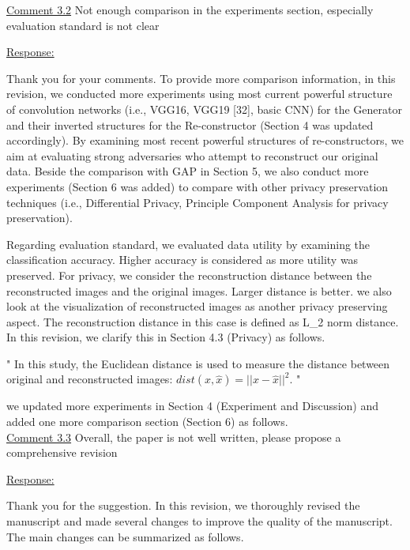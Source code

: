 \documentclass[]{elsarticle}
\begin{document}
\color{blue}
\underline{Comment 3.2} 
Not enough comparison in the experiments section, especially evaluation standard is not clear

\color{black}
\underline{Response:}


Thank you for your comments. To provide more comparison information, in this revision, we conducted more experiments using most current powerful structure of convolution networks (i.e., VGG16, VGG19 [32], basic CNN) for the Generator and their inverted structures for the Re-constructor (Section 4 was updated accordingly). By examining most recent powerful structures of re-constructors, we aim at evaluating strong adversaries who attempt to reconstruct our original data. Beside the comparison with GAP in Section 5, we also conduct more experiments (Section 6 was added) to compare with other privacy preservation techniques (i.e., Differential Privacy, Principle Component Analysis for privacy preservation).

Regarding evaluation standard, we evaluated data utility by examining the classification accuracy. Higher accuracy is considered as more utility was preserved. For privacy, we consider the reconstruction distance between the reconstructed images and the original images. Larger distance is better. we also look at the visualization of reconstructed images as another privacy preserving aspect. The reconstruction distance in this case is defined as L\_2 norm distance. In this revision, we clarify this in Section 4.3 (Privacy) as follows.

"
In this study, the Euclidean distance is used to measure the distance between original and reconstructed images: $dist(x,\hat{x}) = ||x-\hat{x}||^2$. 
" 

we updated more experiments in Section 4 (Experiment and Discussion) and added one more comparison section (Section 6) as follows.\\


\color{blue}
\underline{Comment 3.3} 
Overall, the paper is not well written, please propose a comprehensive revision

\color{black}
\underline{Response:}

Thank you for the suggestion. In this revision, we thoroughly revised the manuscript and made several changes to improve the quality of the manuscript. The main changes can be summarized as follows. 
\end{document}
